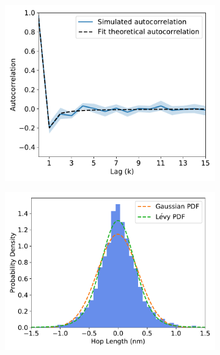 \documentclass{article}
\begin{document}
\begin{figure}[htb!]
\begin{subfigure}{0.3\textwidth}
  \includegraphics[width=\textwidth]{ACH_hop_acf.pdf}
  \caption{}\label{fig:ACH_hop_acf}
  \end{subfigure}
  \begin{subfigure}{0.3\textwidth}
  \includegraphics[width=\textwidth]{gaussian_levy_comparison_anomalous_MET.pdf}
  \caption{}\label{fig:MET_hop_distribution_comparison}
  \end{subfigure}
  \begin{subfigure}{0.3\textwidth}

\end{subfigure}
\end{figure}
\end{document}
